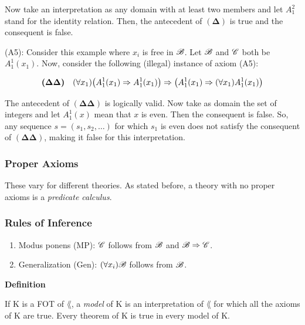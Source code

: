 Now take an interpretation as any domain with at least two members and let $A_1^2$ stand for the identity relation. Then, the antecedent of $\bm{(\Delta)}$ is true and the consequent is false.

(A5): Consider this example where $x_i$ is free in $\mathscr{B}$. Let $\mathscr{B}$ and $\mathscr{C}$ both be $A_1^1(x_1)$. Now, consider the following (illegal) instance of axiom (A5):

\[\bm{(\Delta \Delta)} \quad (\forall x_1)\big( A_1^1(x_1) \Rightarrow A_1^1(x_1)\big) \Rightarrow \big(A_1^1(x_1) \Rightarrow (\forall x_1) A_1^1(x_1) \big)\]

The antecedent of $\bm{(\Delta \Delta)}$ is logically valid. Now take as domain the set of integers and let $A_1^1(x)$ mean that $x$ is even. Then the consequent is false. So, any sequence $s=(s_1,s_2, \dots)$ for which $s_1$ is even does not satisfy the consequent of $\bm{(\Delta \Delta)}$, making it false for this interpretation.

\subsubsection{Proper Axioms}

These vary for different theories. As stated before, a theory with no proper axioms is a \textit{predicate calculus}.

\subsubsection{Rules of Inference}

\begin{enumerate}
    \item Modus ponens (MP): $\mathscr{C}$ follows from $\mathscr{B}$ and $\mathscr{B} \Rightarrow \mathscr{C}$.
    \item Generalization (Gen): $(\forall x_i) \mathscr{B}$ follows from $\mathscr{B}$.
\end{enumerate} 

\textbf{Definition}

If K is a FOT of $\lang$, a \textit{model} of K is an interpretation of $\lang$ for which all the axioms of K are true. Every theorem of K is true in every model of K.
